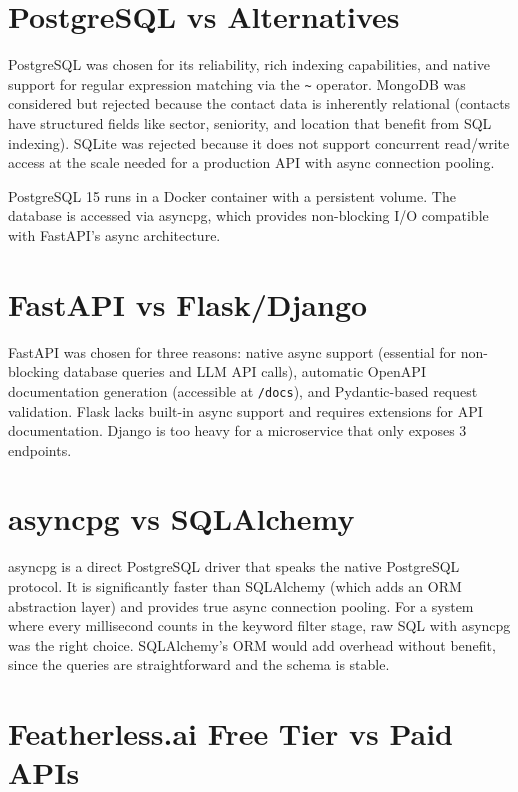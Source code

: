 \documentclass[12pt, a4paper]{report}
\begin{document}
\section{PostgreSQL vs Alternatives}

PostgreSQL was chosen for its reliability, rich indexing capabilities, and native support for regular expression matching via the \texttt{\textasciitilde} operator. MongoDB was considered but rejected because the contact data is inherently relational (contacts have structured fields like sector, seniority, and location that benefit from SQL indexing). SQLite was rejected because it does not support concurrent read/write access at the scale needed for a production API with async connection pooling.

PostgreSQL 15 runs in a Docker container with a persistent volume. The database is accessed via asyncpg, which provides non-blocking I/O compatible with FastAPI's async architecture.

\section{FastAPI vs Flask/Django}

FastAPI was chosen for three reasons: native async support (essential for non-blocking database queries and LLM API calls), automatic OpenAPI documentation generation (accessible at \texttt{/docs}), and Pydantic-based request validation. Flask lacks built-in async support and requires extensions for API documentation. Django is too heavy for a microservice that only exposes 3 endpoints.

\section{asyncpg vs SQLAlchemy}

asyncpg is a direct PostgreSQL driver that speaks the native PostgreSQL protocol. It is significantly faster than SQLAlchemy (which adds an ORM abstraction layer) and provides true async connection pooling. For a system where every millisecond counts in the keyword filter stage, raw SQL with asyncpg was the right choice. SQLAlchemy's ORM would add overhead without benefit, since the queries are straightforward and the schema is stable.

\section{Featherless.ai Free Tier vs Paid APIs}
\end{document}
